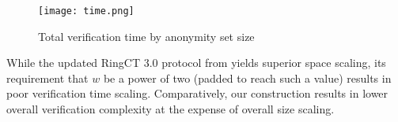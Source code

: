 \documentclass{article}
\theoremstyle{definition}
\begin{document}
\begin{figure}
\centering
\texttt{[image: time.png]}
\caption{Total verification time by anonymity set size}
\label{fig:time}
\end{figure}

While the updated RingCT 3.0 protocol from \cite{rct3} yields superior space scaling, its requirement that $w$ be a power of two (padded to reach such a value) results in poor verification time scaling.
Comparatively, our construction results in lower overall verification complexity at the expense of overall size scaling.




\end{document}
